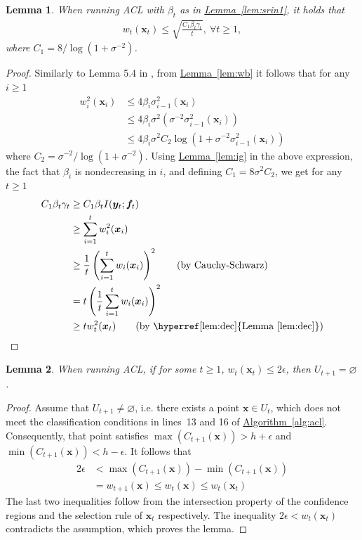\documentclass{article}
\def\*#1{\bm{#1}}
\newcommand{\algoref}[1]{\hyperref[#1]{\mbox{Algorithm~\ref*{#1}}}}
\newcommand{\lemmaref}[1]{\hyperref[#1]{\mbox{Lemma~\ref*{#1}}}}
\newtheorem{lemma}{Lemma}
\newcommand{\acl}{\textsf{ACL}\xspace}
\begin{document}
\begin{lemma}
\label{lem:wbound}
When running \acl with $\beta_t$ as in \lemmaref{lem:srin1}, it holds that
\begin{align*}
w_t(\*x_t) \leq \sqrt{\frac{C_1 \beta_t \gamma_t}{t}},\ \forall t \geq 1,
\end{align*}
where $C_1 = 8 / \log(1 + \sigma^{-2})$.
\end{lemma}
\begin{proof}
Similarly to Lemma 5.4 in \cite{srinivas2010},
from \lemmaref{lem:wb} it follows that for any $i \geq 1$
\begin{align*}
w_i^2(\*x_i) &\leq 4\beta_i\sigma_{i-1}^2(\*x_i)\\
&\leq 4\beta_i\sigma^2(\sigma^{-2}\sigma_{i-1}^2(\*x_i))\\
&\leq 4\beta_i\sigma^2 C_2\log(1 + \sigma^{-2}\sigma_{i-1}^2(\*x_i))
\end{align*}
where $C_2 = \sigma^{-2}/\log(1 + \sigma^{-2})$.
Using \lemmaref{lem:ig} in the above expression, the fact that $\beta_i$
is nondecreasing in $i$, and defining $C_1 = 8\sigma^2C_2$,
we get for any $t \geq 1$
\begin{align*}
C_1\beta_t\gamma_t &\geq C_1\beta_t I(\*y_t; \*f_t)\\
                   &\geq \sum_{i=1}^t w_i^2(\*x_i)\\
                   &\geq \frac{1}{t}\left(\sum_{i=1}^t w_i(\*x_i)\right)^2 \tag*{\textrm{(by Cauchy-Schwarz)}}\\
                   &= t \left(\frac{1}{t}\sum_{i=1}^t w_i(\*x_i)\right)^2\\
                   &\geq t w_t^2(\*x_t) \tag*{\textrm{(by \lemmaref{lem:dec})}}
\end{align*}
\end{proof}

\begin{lemma}
When running \acl, if for some $t \geq 1$, $w_t(\*x_t) \leq 2\epsilon$,
then $U_{t+1} = \varnothing$.
\end{lemma}
\begin{proof}
Assume that $U_{t+1} \neq \varnothing$, i.e. there exists a point
$\*x \in U_t$, which does not meet the classification conditions in
lines~13 and 16 of \algoref{alg:acl}. Consequently, that point
satisfies $\max(C_{t+1}(\*x)) > h + \epsilon$ and
$\min(C_{t+1}(\*x)) < h - \epsilon$. It follows that
\begin{align*}
2\epsilon &< \max(C_{t+1}(\*x)) - \min(C_{t+1}(\*x))\\
&= w_{t+1}(\*x) \leq w_t(\*x) \leq w_t(\*x_t)
\end{align*}
The last two inequalities follow from the intersection property of
the confidence regions and the selection rule of $\*x_t$ respectively.
The inequality $2\epsilon < w_t(\*x_t)$ contradicts the assumption, which
proves the lemma.
\end{proof}
\end{document}
